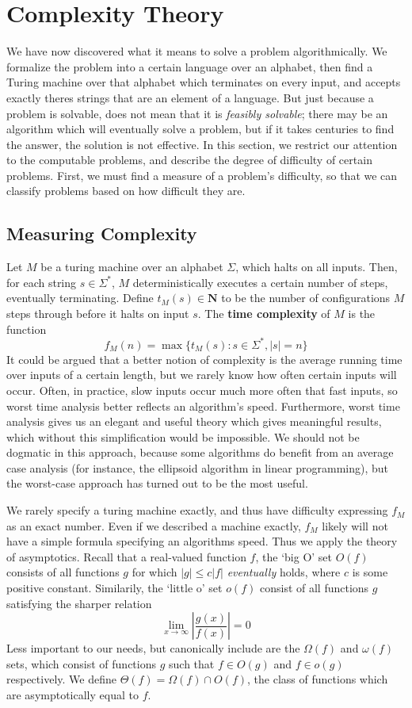 \chapter{Complexity Theory}

We have now discovered what it means to solve a problem algorithmically. We formalize the problem into a certain language over an alphabet, then find a Turing machine over that alphabet which terminates on every input, and accepts exactly theres strings that are an element of a language. But just because a problem is solvable, does not mean that it is {\it feasibly solvable}; there may be an algorithm which will eventually solve a problem, but if it takes centuries to find the answer, the solution is not effective. In this section, we restrict our attention to the computable problems, and describe the degree of difficulty of certain problems. First, we must find a measure of a problem's difficulty, so that we can classify problems based on how difficult they are.

\section{Measuring Complexity}

Let $M$ be a turing machine over an alphabet $\Sigma$, which halts on all inputs. Then, for each string $s \in \Sigma^*$, $M$ deterministically executes a certain number of steps, eventually terminating. Define $t_M(s) \in \mathbf{N}$ to be the number of configurations $M$ steps through before it halts on input $s$. The {\bf time complexity} of $M$ is the function
%
\[ f_M(n) = \max \{ t_M(s): s \in \Sigma^*, |s| = n \} \]
%
It could be argued that a better notion of complexity is the average running time over inputs of a certain length, but we rarely know how often certain inputs will occur. Often, in practice, slow inputs occur much more often that fast inputs, so worst time analysis better reflects an algorithm's speed. Furthermore, worst time analysis gives us an elegant and useful theory which gives meaningful results, which without this simplification would be impossible. We should not be dogmatic in this approach, because some algorithms do benefit from an average case analysis (for instance, the ellipsoid algorithm in linear programming), but the worst-case approach has turned out to be the most useful.

We rarely specify a turing machine exactly, and thus have difficulty expressing $f_M$ as an exact number. Even if we described a machine exactly, $f_M$ likely will not have a simple formula specifying an algorithms speed. Thus we apply the theory of asymptotics. Recall that a real-valued function $f$, the `big O' set $O(f)$ consists of all functions $g$ for which $|g| \leq c|f|$ {\it eventually} holds, where $c$ is some positive constant. Similarily, the `little o' set $o(f)$ consist of all functions $g$ satisfying the sharper relation
%
\[ \lim_{x \to \infty} \left|\frac{g(x)}{f(x)}\right| = 0 \]
%
Less important to our needs, but canonically include are the $\Omega(f)$ and $\omega(f)$ sets, which consist of functions $g$ such that $f \in O(g)$ and $f \in o(g)$ respectively. We define $\Theta(f) = \Omega(f) \cap O(f)$, the class of functions which are asymptotically equal to $f$.

